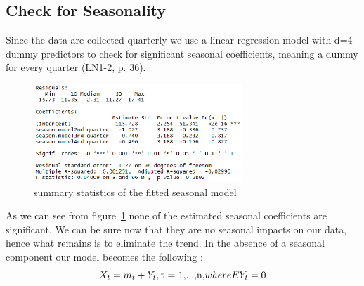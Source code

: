 \documentclass[11pt,a4paper]{article}
\begin{document}
\subsection{Check for Seasonality}
Since the data are collected quarterly we use a linear regression model with d=4 dummy predictors to check for significant seasonal coefficients, meaning a dummy for every quarter (LN1-2, p. 36). 
\begin{figure}[!htb]
\centering
\includegraphics[angle=0,
width=0.7\textwidth]{summary_seasonmodel}
\caption{summary statistics of the fitted seasonal model\label{fig:summary_seasonmodel}}
\end{figure}
As we can see from figure~\ref{fig:summary_seasonmodel} none of the estimated seasonal coefficients are significant. We can be sure now that they are no seasonal impacts on our data, hence what remains is to eliminate the trend. In the absence of a seasonal component our model becomes the following \cite[p.~24]{bd02}:
\begin{equation}
X_t = m_t + Y_t, \text{t = 1,...,n,} 
\\where EY_t = 0
\end{equation} 
\end{document}
